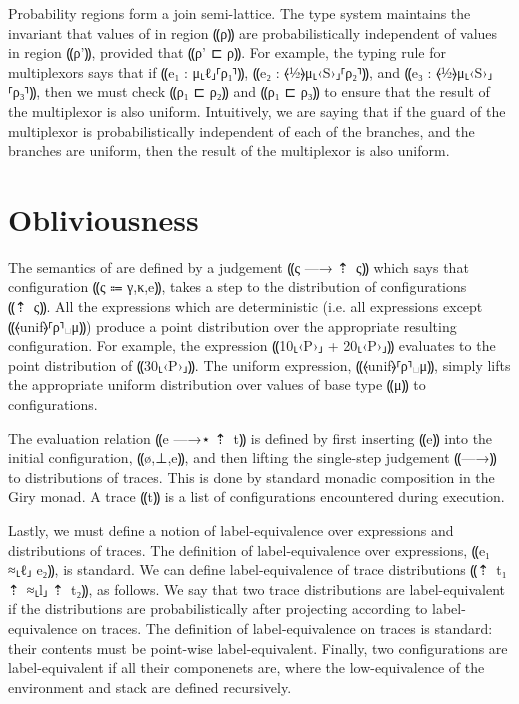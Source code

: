 Probability regions form a join semi-lattice. The type system maintains the invariant that
values of in region ⸨ρ⸩ are probabilistically independent of values in region ⸨ρ'⸩, provided
that ⸨ρ' ⊏ ρ⸩. For example, the typing rule for
multiplexors says that if ⸨e₁ : μ⸤ℓ⸥⸢ρ₁⸣⸩, ⸨e₂ : ⦑½⦒μ⸤‹S›⸥⸢ρ₂⸣⸩, and ⸨e₃ : ⦑½⦒μ⸤‹S›⸥⸢ρ₃⸣⸩,
then we must check ⸨ρ₁ ⊏ ρ₂⸩ and ⸨ρ₁ ⊏ ρ₃⸩ to ensure that the result of the multiplexor
is also uniform. Intuitively, we are saying that if the guard of the multiplexor is probabilistically
independent of each of the branches, and the branches are uniform, then the result
of the multiplexor is also uniform.

\section{Obliviousness}
\label{sec:lam-obliv-obliviousness}

The semantics of \obliv are defined by a judgement ⸨ς —→ ⇡~{ς}⸩ which says that
configuration ⸨ς ⩴ γ,κ,e⸩, takes a step to the distribution of configurations ⸨⇡~{ς}⸩.
All the expressions which are deterministic (i.e. all expressions except ⸨⦑unif⦒⸢ρ⸣␣μ⸩)
produce a point distribution over the appropriate resulting configuration. For example,
the expression ⸨10⸤‹P›⸥ + 20⸤‹P›⸥⸩ evaluates to the point distribution of ⸨30⸤‹P›⸥⸩.
The uniform expression, ⸨⦑unif⦒⸢ρ⸣␣μ⸩, simply lifts the appropriate uniform distribution
over values of base type ⸨μ⸩ to configurations.

The evaluation relation ⸨e —→⋆ ⇡~{t}⸩ is defined by first inserting ⸨e⸩ into the initial
configuration, ⸨ø,⊥,e⸩, and then lifting the single-step judgement ⸨—→⸩ to distributions
of traces. This is done by standard monadic composition in the Giry monad. A trace ⸨t⸩
is a list of configurations encountered during execution.

Lastly, we must define a notion of label-equivalence over expressions and distributions
of traces. The definition of label-equivalence over expressions, ⸨e₁ ≈⸤ℓ⸥ e₂⸩, is standard.
We can define label-equivalence of trace distributions ⸨⇡~{t₁} ⇡~≈⸤l⸥ ⇡~{t₂}⸩, as follows.
We say that two trace distributions are label-equivalent if the distributions are probabilistically
after projecting according to label-equivalence on traces. The definition of label-equivalence on traces
is standard: their contents must be point-wise label-equivalent. Finally, two configurations are label-equivalent
if all their componenets are, where the low-equivalence of the environment and stack are defined recursively.

